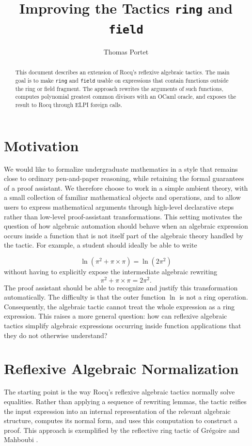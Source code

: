 \documentclass[11pt]{article}
\title{Improving the Tactics \texttt{ring} and \texttt{field}\\
 }
\author{Thomas Portet}
\begin{document}
\maketitle

\begin{abstract}
This document describes an extension of Rocq's reflexive algebraic tactics. The
main goal is to make \texttt{ring} and \texttt{field} usable on expressions that
contain functions outside the ring or field fragment. The approach rewrites the
arguments of such functions, computes polynomial greatest common divisors with
an OCaml oracle, and exposes the result to Rocq through ELPI foreign calls.
\end{abstract}
\section{Motivation}

We would like to formalize undergraduate mathematics in a style that remains close to ordinary pen-and-paper reasoning, while retaining the formal guarantees of a proof assistant. We therefore choose to work in a simple ambient theory, with a small collection of familiar mathematical objects and operations, and to allow users to express mathematical arguments through high-level declarative steps rather than low-level proof-assistant transformations.
\newline \newline
This setting motivates the question of how algebraic automation should behave when an algebraic expression occurs inside a function that is not itself part of the algebraic theory handled by the tactic. For example, a student should ideally be able to write

\[
\ln(\pi^2+\pi\times\pi)=\ln(2\pi^2)
\]
without having to explicitly expose the intermediate algebraic rewriting
\[
\pi^2+\pi\times\pi=2\pi^2.
\]
The proof assistant should be able to recognize and justify this transformation automatically.\newline
The difficulty is that the outer function $\ln$ is not a ring operation. Consequently, the algebraic tactic cannot treat the whole expression as a ring expression. This raises a more general question: how can reflexive algebraic tactics simplify algebraic expressions occurring inside function applications that they do not otherwise understand?

\section{Reflexive Algebraic Normalization}
The starting point is the way Rocq's reflexive algebraic tactics normally solve
equalities. Rather than applying a sequence of rewriting lemmas, the tactic
reifies the input expression into an internal representation of the relevant
algebraic structure, computes its normal form, and uses this computation to
construct a proof. This approach is exemplified by the reflective ring tactic of Grégoire and Mahboubi \cite{gregoire2005proving}.
\end{document}
